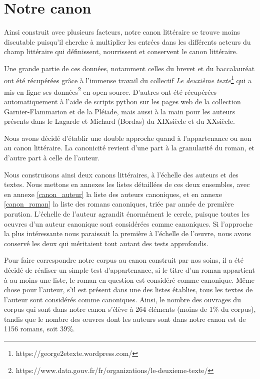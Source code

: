 \section{Notre canon}\label{notre_canon}

Ainsi construit avec plusieurs facteurs, notre canon littéraire se trouve moins discutable puisqu'il cherche à multiplier les entrées dans les différents acteurs du champ littéraire qui définissent, nourrissent et conservent le canon littéraire. 

Une grande partie de ces données, notamment celles du brevet et du baccalauréat ont été récupérées grâce à l'immense travail du collectif \textit{Le deuxième texte}\footnote{https://george2etexte.wordpress.com/} qui a mis en ligne ses données\footnote{https://www.data.gouv.fr/fr/organizations/le-deuxieme-texte/} en open source. D'autres ont été récupérées automatiquement à l'aide de scripts python sur les pages web de la collection Garnier-Flammarion et de la Pléiade, mais aussi à la main pour les auteurs présents dans le Lagarde et Michard (Bordas) du XIX\ieme siècle et du XX\ieme siècle.

Nous avons décidé d'établir une double approche quand à l'appartenance ou non au canon littéraire. La canonicité revient d'une part à la granularité du roman, et d'autre part à celle de l'auteur. 

Nous construisons ainsi deux canons littéraires, à l'échelle des auteurs et des textes. Nous mettons en annexes les listes détaillées de ces deux ensembles, avec en annexe \ref{canon_auteur} la liste des auteurs canoniques, et en annexe \ref{canon_roman} la liste des romans canoniques, triée par année de première parution. L'échelle de l'auteur agrandit énormément le cercle, puisque toutes les oeuvres d'un auteur canonique sont considérées comme canoniques. Si l'approche la plus intéressante nous paraissait la première à l'échelle de l'œuvre, nous avons conservé les deux qui méritaient tout autant des tests approfondis. 

Pour faire correspondre notre corpus au canon construit par nos soins, il a été décidé de réaliser un simple test d'appartenance, si le titre d'un roman appartient à au moins une liste, le roman en question est considéré comme canonique. Même chose pour l'auteur, s'il est présent dans une des listes établies, tous les textes de l'auteur sont considérés comme canoniques. Ainsi, le nombre des ouvrages du corpus qui sont dans notre canon s'élève à 264 éléments (moins de 1\% du corpus), tandis que le nombre des œuvres dont les auteurs sont dans notre canon est de 1156 romans, soit 39\%.

